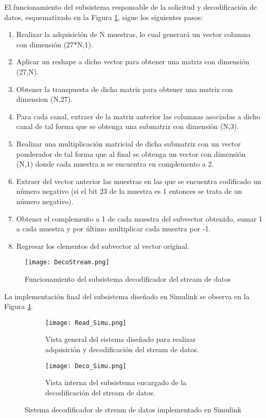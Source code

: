 El funcionamiento del subsistema responsable de la solicitud y decodificación de datos, esquematizado en la Figura \ref{Figura: DecoStream}, sigue los siguientes pasos:

\begin{enumerate}
	\item Realizar la adquisición de N muestras, lo cual generará un vector columna con dimensión (27*N,1).
	\item Aplicar un reshape a dicho vector para obtener una matriz con dimensión (27,N).
	\item Obtener la transpuesta de dicha matriz para obtener una matriz con dimension (N,27).
	\item Para cada canal, extraer de la matriz anterior las columnas asociadas a dicho canal de tal forma que se obtenga una submatriz con dimensión (N,3).
	\item Realizar una multiplicación matricial de dicha submatriz con un vector ponderador de tal forma que al final se obtenga un vector con dimensión (N,1) donde cada muestra n se encuentra en complemento a 2.
	\item Extraer del vector anterior las muestras en las que se encuentra codificado un número negativo (si el bit 23 de la muestra es 1 entonces se trata de un número negativo).
	\item Obtener el complemento a 1 de cada muestra del subvector obtenido, sumar 1 a cada muestra y por último multiplicar cada muestra por -1.
	\item Regresar los elementos del subvector al vector original.
\end{enumerate}

\begin{figure}[htbp]
\centering
	\texttt{[image: DecoStream.png]}
	\caption{Funcionamiento del subsistema decodificador del stream de datos}
	\label{Figura: DecoStream}
\end{figure}


La implementación final del subsistema diseñado en Simulink se observa en la Figura \ref{Figura: DecoSimuT}.

\begin{figure}[htbp]
	\centering
	\begin{subfigure}[htbp]{0.8\textwidth}
		\texttt{[image: Read\_Simu.png]}
		\caption{Vista general del sistema diseñado para realizar adquisición y decodificación del stream de datos.}
		\label{Figura: readSimu}
	\end{subfigure}
	\begin{subfigure}[htbp]{0.8\textwidth}
		\texttt{[image: Deco\_Simu.png]}
		\caption{Vista interna del subsistema encargado de la decodificación del stream de datos.}
		\label{Figura: decoSimu}
	\end{subfigure}
	\caption{Sistema decodificador de stream de datos implementado en Simulink}
	\label{Figura: DecoSimuT}
\end{figure}

